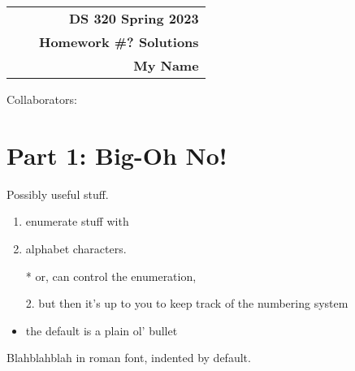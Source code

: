 \documentclass[11pt]{article}
\makeatletter
\renewcommand\maketitle{
\begin{center}
\begin{tabular*}{6.44in}{l @{\extracolsep{\fill}}c r}
\bfseries  &  & \bfseries DS 320 Spring 2023 \\
\bfseries&  & \bfseries  Homework \#? Solutions  \\
\bfseries   &   &  \bfseries My Name \\ 
\end{tabular*}
\end{center} }
\makeatother
\begin{document}
\maketitle


\noindent Collaborators:


\section*{Part  1: Big-Oh No!} 






\vspace*{50pt}

\noindent Possibly useful stuff.

\begin{enumerate}
\item enumerate stuff with
\item alphabet characters.
\end{enumerate}

\begin{itemize}
\item[*] or, can control the enumeration,
\item[2.] but then it's up to you to keep track of the numbering system
\item the default is a plain ol' bullet
\end{itemize}

Blahblahblah in roman font, indented by default.\\ 

 
\end{document}

